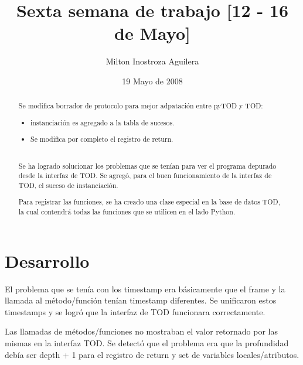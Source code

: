 \documentclass[10pt,a4paper]{article}
\begin{document}
\renewcommand{\contentsname}{Indice} 
\renewcommand\listfigurename{Lista de Figuras}
\renewcommand\listtablename{Lista de Tablas}
\newcommand\bibname{Bibliografía}
\renewcommand{\refname}{Bibliografía}
\renewcommand\indexname{Indice alfabético}
\renewcommand\figurename{Figura}
\renewcommand\tablename{Tabla}
\renewcommand\partname{Parte}
\newcommand\chaptername{Capítulo}
\renewcommand\appendixname{Apéndice}
\renewcommand\abstractname{Resumen}

\title{Sexta semana de trabajo [12 - 16 de Mayo]}
\author{Milton Inostroza Aguilera}
\date{19 Mayo de 2008}
\clearpage
\maketitle

\begin{abstract}

Se modifica borrador de protocolo para mejor adpatación entre pyTOD y TOD:
\begin{itemize}
\item instanciación es agregado a la tabla de sucesos.
\item Se modifica por completo el registro de return.
\end{itemize}
\\
Se ha logrado solucionar los problemas que se tenían para ver el programa depurado desde la interfaz de TOD.  Se agregó, para el buen funcionamiento de la interfaz de TOD, el suceso de instanciación.

Para registrar las funciones, se ha creado una clase especial en la base de datos TOD, la cual contendrá todas las funciones que se utilicen en el lado Python.


\end{abstract}
\newpage
\tableofcontents
\newpage
\listoffigures
\newpage
\listoftables
\newpage
\section{Desarrollo}

El problema que se tenía con los timestamp era básicamente que el frame y la llamada al método/función tenían timestamp diferentes.  Se unificaron estos timestamps y se logró que la interfaz de TOD funcionara correctamente.

Las llamadas de métodos/funciones no mostraban el valor retornado por las mismas en la interfaz TOD.  Se detectó que el problema era que la profundidad debía ser depth + 1 para el registro de return y set de variables locales/atributos.
\end{document}
